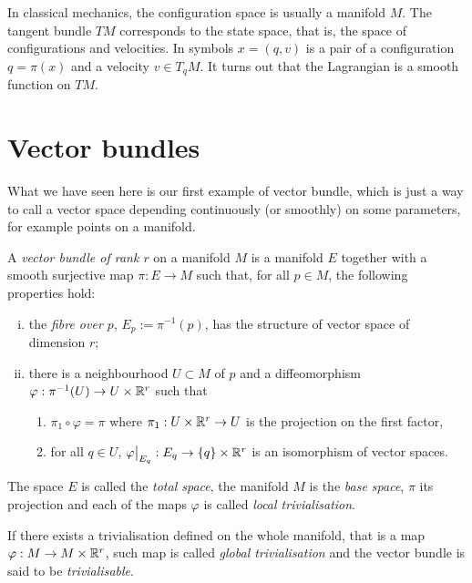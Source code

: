 \begin{remark}
  In classical mechanics, the configuration space is usually a manifold $M$.
  The tangent bundle $TM$ corresponds to the state space, that is, the space of configurations and velocities. In symbols $x=(q,v)$ is a pair of a configuration $q = \pi(x)$ and a velocity $v\in T_q M$.
  It turns out that the Lagrangian is a smooth function on $TM$.
\end{remark}

\section{Vector bundles}\label{sec:vectorbundle}

What we have seen here is our first example of vector bundle, which is just a way to call a vector space depending continuously (or smoothly) on some parameters, for example points on a manifold.

\begin{definition}\label{def:vector_bundle}
  A \emph{vector bundle of rank $r$} on a manifold $M$ is a manifold $E$ together with a smooth surjective map $\pi : E \to M$ such that, for all $p\in M$, the following properties hold:
  \begin{enumerate}[(i)]
    \item the \emph{fibre over $p$}, $E_p := \pi^{-1}(p)$, has the structure of vector space of dimension $r$;
    \item there is a neighbourhood $U\subset M$ of $p$ and a diffeomorphism $\varphi: \pi^{-1}(U) \to U \times \mathbb{R}^r$ such that
    \begin{enumerate}
      \item $\pi_1 \circ \varphi = \pi$ where $\pi_1: U\times\mathbb{R}^r\to U$ is the projection on the first factor,
      \item for all $q\in U$, $\varphi\big|_{E_q} : E_q \to \{q\}\times \mathbb{R}^r$ is an isomorphism of vector spaces.
    \end{enumerate}
  \end{enumerate}

  The space $E$ is called the \emph{total space}, the manifold $M$ is the \emph{base space}, $\pi$ its projection and each of the maps $\varphi$ is called \emph{local trivialisation}.

  If there exists a trivialisation defined on the whole manifold, that is a map $\varphi: M \to M\times \mathbb{R}^r$, such map is called \emph{global trivialisation} and the vector bundle is said to be \emph{trivialisable}.
\end{definition}

